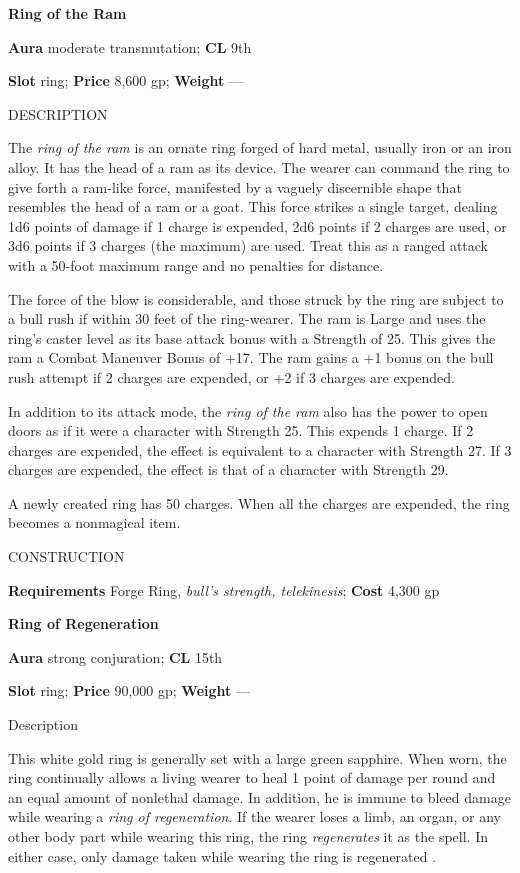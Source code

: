 \textbf{Ring of the Ram}
				
\textbf{Aura} moderate transmutation; \textbf{CL} 9th
				
\textbf{Slot }ring; \textbf{Price} 8,600 gp; \textbf{Weight} ---
				
DESCRIPTION
				
The \textit{ring of the ram }is an ornate ring forged of hard metal, usually iron or an iron alloy. It has the head of a ram as its device. The wearer can command the ring to give forth a ram-like force, manifested by a vaguely discernible shape that resembles the head of a ram or a goat. This force strikes a single target, dealing 1d6 points of damage if 1 charge is expended, 2d6 points if 2 charges are used, or 3d6 points if 3 charges (the maximum) are used. Treat this as a ranged attack with a 50-foot maximum range and no penalties for distance. 
				
The force of the blow is considerable, and those struck by the ring are subject to a bull rush if within 30 feet of the ring-wearer. The ram is Large and uses the ring's caster level as its base attack bonus with a Strength of 25. This gives the ram a Combat Maneuver Bonus of +17. The ram gains a +1 bonus on the bull rush attempt if 2 charges are expended, or +2 if 3 charges are expended.
				
In addition to its attack mode, the \textit{ring of the ram }also has the power to open doors as if it were a character with Strength 25. This expends 1 charge. If 2 charges are expended, the effect is equivalent to a character with Strength 27. If 3 charges are expended, the effect is that of a character with Strength 29.
				
A newly created ring has 50 charges. When all the charges are expended, the ring becomes a nonmagical item.
				
CONSTRUCTION
				
\textbf{Requirements} Forge Ring, \textit{bull's strength, telekinesis}; \textbf{Cost} 4,300 gp
				
\textbf{Ring of Regeneration}
				
\textbf{Aura} strong conjuration;\textbf{ CL }15th
				
\textbf{Slot} ring; \textbf{Price} 90,000 gp; \textbf{Weight} ---
				
Description
				
This white gold ring is generally set with a large green sapphire. When worn, the ring continually allows a living wearer to heal 1 point of damage per round and an equal amount of nonlethal damage. In addition, he is immune to bleed damage while wearing a \textit{ring of regeneration}. If the wearer loses a limb, an organ, or any other body part while wearing this ring, the ring \textit{regenerates }it as the spell. In either case, only damage taken while wearing the ring 
is regenerated
. 
				
